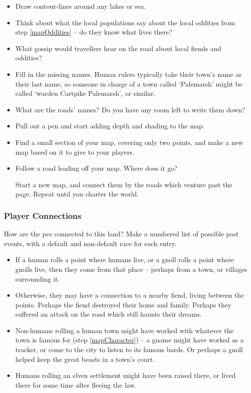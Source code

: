 \begin{multicols}{2}
\begin{itemize}
  \item
  Draw contour-lines around any lakes or sea.
  \item
  Think about what the local populations say about the local oddities from step \ref{mapOddities} -- do they know what lives there?
  \item
  What gossip would travellers hear on the road about local fiends and oddities?
  \item
  Fill in the missing names.
  Human rulers typically take their town's name as their last name, so someone in charge of a town called `Palemarsh' might be called  `\Gls{warden} Cartpike Palemarsh', or similar.
  \item
  What are the roads' names?
  Do you have any room left to write them down?
  \item
  Pull out a pen and start adding depth and shading to the map.
  \item
  Find a small section of your map, covering only two points, and make a new map based on it to give to your players.
  \item
  Follow a road leading off your map.
  Where does it go?

  Start a new map, and connect them by the roads which venture past the page.
  Repeat until you charter the world.
\end{itemize}

\bigLine

\subsubsection{Player Connections}

How are the \glspl{pc} connected to this land?
Make a numbered list of possible past events, with a default and non-default race for each entry.

\begin{itemize}
  \item
  If a human rolls a point where humans live, or a gnoll rolls a point where gnolls live, then they come from that place -- perhaps from a town, or \glspl{village} surrounding it.
  \item
  Otherwise, they may have a connection to a nearby fiend, living between the points.
  Perhaps the fiend destroyed their home and family.
  Perhaps they suffered an attack on the road which still haunts their dreams.
  \item
  Non-humans rolling a human town might have worked with whatever the town is famous for (step \vref{mapCharacter}) -- a gnome might have worked as a tracker, or come to the city to listen to its famous bards.
  Or perhaps a gnoll helped keep the great beasts in a town's \gls{court}.
  \item
  Humans rolling an elven settlement might have been raised there, or lived there for some time after fleeing the law.
\end{itemize}


\end{multicols}
